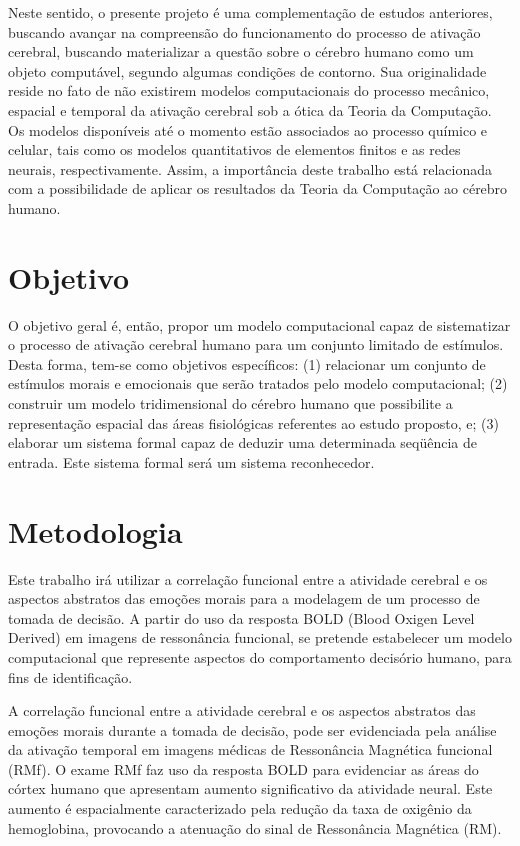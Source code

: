 \documentclass[paper=a4, fontsize=11pt]{scrartcl}
\numberwithin{equation}{section}		%
\numberwithin{figure}{section}			%
\numberwithin{table}{section}				%
\begin{document}
Neste sentido, o presente projeto é uma complementação de estudos anteriores, buscando avançar na compreensão do funcionamento do processo de ativação cerebral, buscando materializar a questão sobre o cérebro humano como um objeto computável, segundo algumas condições de contorno. Sua originalidade reside no fato de não existirem modelos computacionais do processo mecânico, espacial e temporal da ativação cerebral sob a ótica da Teoria da Computação. Os modelos disponíveis até o momento estão associados ao processo químico e celular, tais como os modelos quantitativos de elementos finitos e as redes neurais, respectivamente. Assim, a importância deste trabalho está relacionada com a possibilidade de aplicar os resultados da Teoria da Computação ao cérebro humano.


\section{Objetivo}

O objetivo geral é, então, propor um modelo computacional capaz de sistematizar o processo de ativação cerebral humano para um conjunto limitado de estímulos. Desta forma, tem-se como objetivos específicos: (1) relacionar um conjunto de estímulos morais e emocionais que serão tratados pelo modelo computacional; (2) construir um modelo tridimensional do cérebro humano que possibilite a representação espacial das áreas fisiológicas referentes ao estudo proposto, e; (3) elaborar um sistema formal capaz de deduzir uma determinada seqüência de entrada. Este sistema formal será um sistema reconhecedor.


\section{Metodologia}

Este trabalho irá utilizar a correlação funcional entre a atividade cerebral e os aspectos abstratos das emoções morais para a modelagem de um processo de tomada de decisão. A partir do uso da resposta BOLD (Blood Oxigen Level Derived) em imagens de ressonância funcional, se pretende estabelecer um modelo computacional que represente aspectos do comportamento decisório humano, para fins de identificação. 
  
A correlação funcional entre a atividade cerebral e os aspectos abstratos das emoções morais durante a tomada de decisão, pode ser evidenciada pela análise da ativação temporal em imagens médicas de Ressonância Magnética funcional (RMf). O exame RMf faz uso da resposta BOLD para evidenciar as áreas do córtex humano que apresentam aumento significativo da atividade neural. Este aumento é espacialmente caracterizado pela redução da taxa de oxigênio da hemoglobina, provocando a atenuação do sinal de Ressonância Magnética (RM). 
\end{document}
